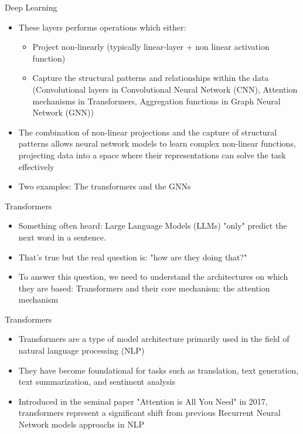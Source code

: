 \begin{frame}{Deep Learning}

  \begin{itemize}
    \item These layers performs operations which either:
    \begin{itemize}
      \item Project non-linearly (typically linear-layer + non linear activation function)
      \item Capture the structural patterns and relationships within the data (Convolutional layers in Convolutional Neural Network (CNN), Attention mechanisms in Transformers, Aggregation functions in Graph Neural Network (GNN))
    \end{itemize}
    \item The combination of non-linear projections and the capture of structural patterns allows neural network models to learn complex non-linear functions, projecting data into a space where their representations can solve the task effectively
    \item Two examples: The transformers and the GNNs
  \end{itemize}


\end{frame}



\begin{frame}{Transformers}
  \begin{itemize}
      \item Something often heard: Large Language Models (LLMs) "only" predict the next word in a sentence.
      \item That's true but the real question is: "how are they doing that?"
      \item To answer this question, we need to understand the architectures on which they are based: Transformers and their core mechanism: the attention mechanism
  \end{itemize}
\end{frame}


\begin{frame}{Transformers}
    \begin{itemize}
        \item Transformers are a type of model architecture primarily used in the field of natural language processing (NLP)
        \item They have become foundational for tasks such as translation, text generation, text summarization, and sentiment analysis
        \item Introduced in the seminal paper "Attention is All You Need" in 2017, transformers represent a significant shift from previous Recurrent Neural Network models approachs in NLP
      \end{itemize}
\end{frame}

